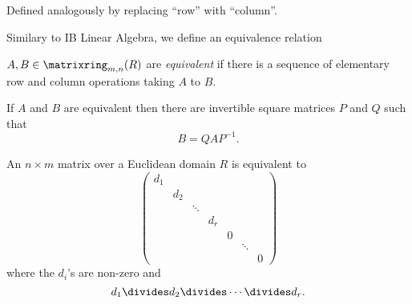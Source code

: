 \documentclass[a4paper]{article}
\begin{document}
\begin{definition}
  Defined analogously by replacing ``row'' with ``column''.
\end{definition}

Similary to IB Linear Algebra, we define an equivalence relation

\begin{definition}[Equivalence]
  \(A, B \in \matrixring_{m, n}(R)\) are \emph{equivalent} if there is a sequence of elementary row and column operations taking \(A\) to \(B\).
\end{definition}

If \(A\) and \(B\) are equivalent then there are invertible square matrices \(P\) and \(Q\) such that
\[
  B = QAP^{-1}.
\]

\begin{theorem}
  An \(n \times m\) matrix over a Euclidean domain \(R\) is equivalent to
  \[
    \begin{pmatrix}
      d_1 \\
      & d_2 \\
      & & \ddots \\
      & & & d_r \\
      & & & & 0 \\
      & & & & & \ddots \\
      & & & & & & 0
    \end{pmatrix}
  \]
  where the \(d_i\)'s are non-zero and
  \[
    d_1 \divides d_2 \divides \cdots \divides d_r.
  \]
\end{theorem}
\end{document}
